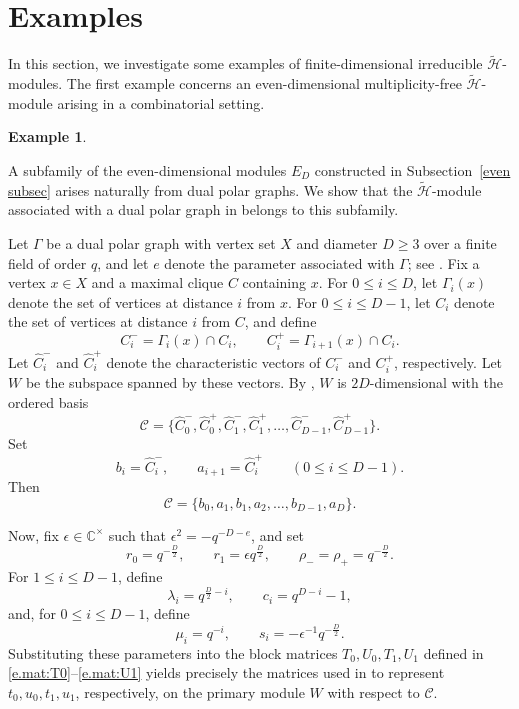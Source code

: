\documentclass[reqno]{amsart}
\theoremstyle{definition}
\newtheorem{example}[theorem]{Example}
\begin{document}
\section{Examples}\label{Sec:ex}




In this section,
we investigate some examples of finite-dimensional irreducible $\widetilde{\mathcal{H}}$-modules.
The first example concerns an even-dimensional multiplicity-free $\widetilde{\mathcal H}$-module arising in a combinatorial setting.


\begin{example}\label{ex:dual-polar}
%
{\rm
A subfamily of the even-dimensional modules $E_D$
constructed in Subsection~\ref{even subsec} arises naturally from dual polar graphs.
We show that the $\widetilde{\mathcal{H}}$-module associated with a dual polar graph in
\cite{LeeTanaka} belongs to this subfamily.

Let $\Gamma$ be a dual polar graph with vertex set $X$ and diameter
$D\geq 3$ over a finite field of order $q$, and let $e$ denote the
parameter associated with $\Gamma$; see \cite[Section~9.4]{BCN}.
Fix a vertex $x\in X$ and a maximal clique $C$ containing $x$.
For $0\leq i\leq D$, let $\Gamma_i(x)$ denote the set of vertices at distance $i$ from $x$.
For $0\leq i\leq D-1$, let $C_i$ denote the set of vertices at distance
$i$ from $C$, and define
$$
C_i^-=\Gamma_i(x)\cap C_i,
\qquad
C_i^+=\Gamma_{i+1}(x)\cap C_i.
$$
Let $\widehat{C}_i^-$ and $\widehat{C}_i^+$ denote the characteristic
vectors of $C_i^-$ and $C_i^+$, respectively.
Let $W$ be the subspace spanned by these vectors.
By \cite{LeeTanaka}, $W$ is $2D$-dimensional with the ordered basis
$$
\mathcal{C}
=
\{
\widehat{C}_0^-,\widehat{C}_0^+,
\widehat{C}_1^-,\widehat{C}_1^+,
\dots,
\widehat{C}_{D-1}^-,\widehat{C}_{D-1}^+
\}.
$$
Set
$$
b_i=\widehat{C}_i^-,
\qquad
a_{i+1}=\widehat{C}_i^+
\qquad (0\leq i\leq D-1).
$$
Then
$$
\mathcal{C} = \{b_0,a_1,b_1,a_2,\dots,b_{D-1},a_D\}.
$$

Now, fix $\epsilon\in\mathbb{C}^{\times}$ such that
$\epsilon^2=-q^{-D-e}$, and set
$$
r_0=q^{-\frac{D}{2}},
\qquad
r_1=\epsilon q^{\frac{D}{2}},
\qquad
\rho_-=\rho_+=q^{-\frac{D}{2}}.
$$
For $1\leq i\leq D-1$, define
$$
\lambda_i=q^{\frac{D}{2}-i},
\qquad
c_i=q^{D-i}-1,
$$
and, for $0\leq i\leq D-1$, define
$$
\mu_i=q^{-i},
\qquad
s_i=-\epsilon^{-1}q^{-\frac{D}{2}}.
$$
Substituting these parameters into the block matrices
$T_0,U_0,T_1,U_1$ defined in \eqref{e.mat:T0}--\eqref{e.mat:U1} 
yields precisely the matrices used in \cite{LeeTanaka} 
to represent $t_0,u_0,t_1,u_1$, respectively, on the primary 
module $W$ with respect to $\mathcal{C}$.

}
\end{example}
\end{document}
